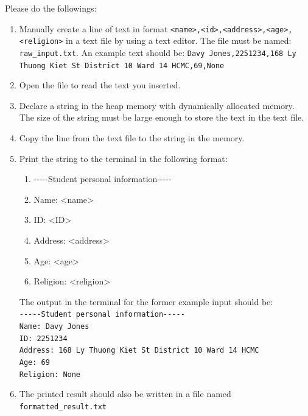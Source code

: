 Please do the followings:
\begin{sloppypar}
\begin{enumerate}
  \item Manually create a line of text in format
        \texttt{<name>,<id>,<address>,<age>,<religion>} in a text file by using a
        text editor. The file must be named: \texttt{raw\_input.txt}.
        An example text should be: \texttt{Davy Jones,2251234,168 Ly Thuong
        Kiet St District 10 Ward 14 HCMC,69,None}
  \item Open the file to read the text you inserted.
  \item Declare a string in the heap memory with dynamically allocated memory.
        The size of the string must be large enough to store the text in the
        text file.
  \item Copy the line from the text file to the string in the memory.
  \item Print the string to the terminal in the following format:
        \begin{enumerate}
          \item -{}-{}-{}-{}-Student personal information-{}-{}-{}-{}-
          \item Name: \textless name\textgreater
          \item ID: \textless ID\textgreater
          \item Address: \textless address\textgreater
          \item Age: \textless age\textgreater
          \item Religion: \textless religion\textgreater
        \end{enumerate}
        The output in the terminal for the former example input should be:\\
        \texttt{-{}-{}-{}-{}-Student personal information-{}-{}-{}-{}-}\\
        \texttt{Name: Davy Jones}\\
        \texttt{ID: 2251234}\\
        \texttt{Address: 168 Ly Thuong Kiet St District 10 Ward 14 HCMC}\\
        \texttt{Age: 69}\\
        \texttt{Religion: None}
  \item The printed result should also be written in a file named
        \texttt{formatted\_result.txt}
\end{enumerate}
\end{sloppypar}

